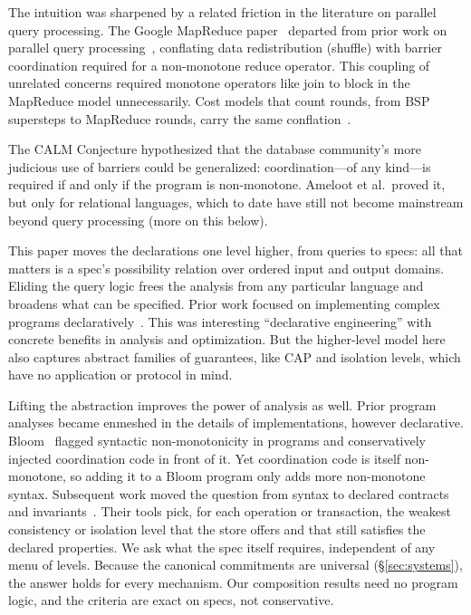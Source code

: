 \documentclass[sigconf]{cidr-2027}
\theoremstyle{remark}
\newcommand{\commitments}{commitments\xspace}
\begin{document}
The intuition was sharpened by a related friction in the literature on parallel
query processing. The Google MapReduce
paper~\cite{dean2004mapreduce} departed from prior work on parallel query
processing~\cite{wilschut1991dataflow,graefe1990volcano}, conflating data
redistribution (shuffle) with barrier coordination required for a non-monotone
reduce operator. This coupling of unrelated concerns required monotone operators
like join to block in the MapReduce model unnecessarily.  Cost models that count
rounds, from BSP supersteps to MapReduce rounds, carry the same
conflation~\cite{valiant1990bsp,karloff2010mrc}.

The CALM Conjecture hypothesized that the database community's more judicious
use of barriers could be generalized: coordination---of any kind---is required
if and only if the program is non-monotone. Ameloot et al.\
proved it, but only for relational languages, which to date have
still not become mainstream beyond query processing (more on this below).

This paper moves the declarations one level higher, from queries to
specs: all that matters is a spec's possibility relation over ordered input
and output domains.  Eliding the query logic frees the analysis from any particular
language and broadens what can be specified. Prior work focused on implementing
complex programs
declaratively~\cite{loo2005overlays,loo2009declarative,chu2007declarative,alvaro2011bloom}.
This was interesting ``declarative engineering'' with concrete benefits in
analysis and optimization. But the higher-level model here also captures abstract
families of guarantees, like CAP and isolation levels, which have no application or
protocol in mind.

Lifting the abstraction improves the power of analysis as well. Prior program
analyses became enmeshed in the details of implementations, however
declarative. Bloom~\cite{alvaro2011bloom} flagged syntactic non-monotonicity in
programs and conservatively injected coordination code in front of it.  Yet
coordination code is itself non-monotone, so adding it to a Bloom program only
adds more non-monotone syntax.  Subsequent work moved the question from syntax to declared contracts and
invariants~\cite{sivaramakrishnan2015quelea,kaki2018alone}.  Their tools pick,
for each operation or transaction, the weakest consistency or isolation level
that the store offers and that still satisfies the declared properties.  We
ask what the spec itself requires, independent of any menu of
levels.  Because the canonical \commitments are universal
(\S\ref{sec:systems}), the answer holds for every mechanism.  Our
composition results need no program logic, and the criteria are exact on
specs, not conservative.
\end{document}
